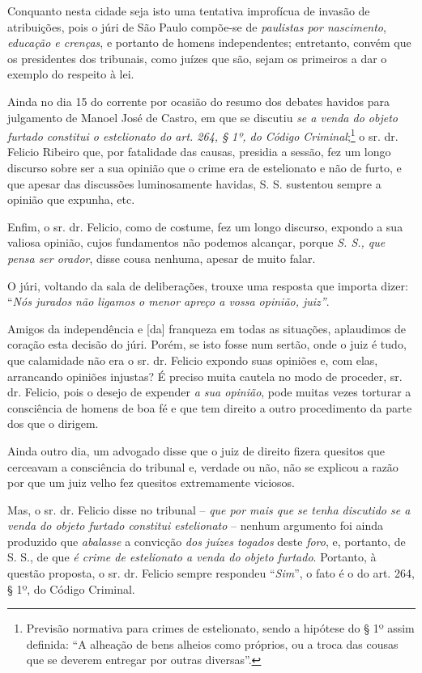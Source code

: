 Conquanto nesta cidade seja isto uma tentativa improfícua de invasão de
atribuições, pois o júri de São Paulo compõe-se de \emph{paulistas por
nascimento}, \emph{educação e crenças}, e portanto de homens
independentes; entretanto, convém que os presidentes dos tribunais, como
juízes que são, sejam os primeiros a dar o exemplo do respeito à lei.

Ainda no dia 15 do corrente por ocasião do resumo dos debates havidos
para julgamento de Manoel José de Castro, em que se discutiu \emph{se a
venda do objeto furtado constitui o estelionato do art. 264, § 1º, do
Código Criminal};\footnote{ Previsão normativa para crimes de
  estelionato, sendo a hipótese do § 1º assim definida: ``A alheação de
  bens alheios como próprios, ou a troca das cousas que se deverem
  entregar por outras diversas''.} o sr. dr. Felicio Ribeiro que, por
fatalidade das causas, presidia a sessão, fez um longo discurso sobre
ser a sua opinião que o crime era de estelionato e não de furto, e que
apesar das discussões luminosamente havidas, S. S. sustentou sempre a
opinião que expunha, etc.

Enfim, o sr. dr. Felicio, como de costume, fez um longo discurso,
expondo a sua valiosa opinião, cujos fundamentos não podemos alcançar,
porque \emph{S. S., que pensa ser orador}, disse cousa nenhuma, apesar
de muito falar.

O júri, voltando da sala de deliberações, trouxe uma resposta que
importa dizer: ``\emph{Nós jurados não ligamos o menor apreço a vossa
opinião, juiz''}.

Amigos da independência e {[}da{]} franqueza em todas as situações,
aplaudimos de coração esta decisão do júri. Porém, se isto fosse num
sertão, onde o juiz é tudo, que calamidade não era o sr. dr. Felicio
expondo suas opiniões e, com elas, arrancando opiniões injustas? É
preciso muita cautela no modo de proceder, sr. dr. Felicio, pois o
desejo de expender \emph{a sua opinião}, pode muitas vezes torturar a
consciência de homens de boa fé e que tem direito a outro procedimento
da parte dos que o dirigem.

Ainda outro dia, um advogado disse que o juiz de direito fizera quesitos
que cerceavam a consciência do tribunal e, verdade ou não, não se
explicou a razão por que um juiz velho fez quesitos extremamente
viciosos.

Mas, o sr. dr. Felicio disse no tribunal -- \emph{que por mais que se
tenha discutido se a venda do objeto furtado constitui estelionato} --
nenhum argumento foi ainda produzido que \emph{abalasse} a convicção
\emph{dos juízes togados} deste \emph{foro}, e, portanto, de S. S., de
que \emph{é crime de estelionato a venda do objeto furtado}. Portanto, à
questão proposta, o sr. dr. Felicio sempre respondeu ``\emph{Sim}'', o
fato é o do art. 264, § 1º, do Código Criminal.

